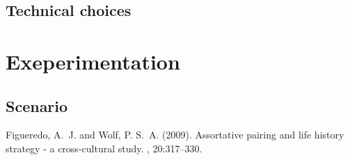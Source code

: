 \documentclass[twoside,twocolumn]{article}
\begin{document}
\subsection{Technical choices}







\section{Exeperimentation}

\subsection{Scenario}





\begin{thebibliography}{99} %

Figueredo, A.~J. and Wolf, P. S.~A. (2009).
\newblock Assortative pairing and life history strategy - a cross-cultural
  study.
, 20:317--330.

\end{thebibliography}

\end{document}
